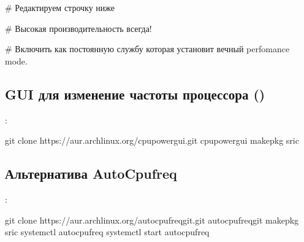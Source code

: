 \documentclass[letterpaper,10pt,russian,openany]{sphinxmanual}
\begin{document}
\sphinxAtStartPar
{} \# Редактируем строчку ниже

\noindent{}

\sphinxAtStartPar
{} \# Высокая производительность всегда!

\sphinxAtStartPar
{} \# Включить как постоянную службу которая установит вечный perfomance mode.

\ignorespaces 

\subsection{GUI для изменение частоты процессора ()}
\label{\detokenize{source/extra-optimizations:gui-xanmod}}\label{\detokenize{source/extra-optimizations:cpupower-gui}}\label{\detokenize{source/extra-optimizations:index-1}}
\noindent{}

\sphinxAtStartPar
{}:

\begin{sphinxVerbatim}[commandchars=\\\{\}]
git clone https://aur.archlinux.org/cpupower\PYGZhy{}gui.git
 cpupower\PYGZhy{}gui
makepkg \PYGZhy{}sric
\end{sphinxVerbatim}

\ignorespaces 

\subsection{Альтернатива \sphinxhyphen{} Auto\sphinxhyphen{}Cpufreq}
\label{\detokenize{source/extra-optimizations:auto-cpufreq}}\label{\detokenize{source/extra-optimizations:index-2}}\label{\detokenize{source/extra-optimizations:id3}}
\sphinxAtStartPar
{}:

\begin{sphinxVerbatim}[commandchars=\\\{\}]
git clone https://aur.archlinux.org/auto\PYGZhy{}cpufreq\PYGZhy{}git.git  
 auto\PYGZhy{}cpufreq\PYGZhy{}git                                       
makepkg \PYGZhy{}sric                                             
systemctl  auto\PYGZhy{}cpufreq                             
systemctl start auto\PYGZhy{}cpufreq                              
\end{sphinxVerbatim}
\end{document}
